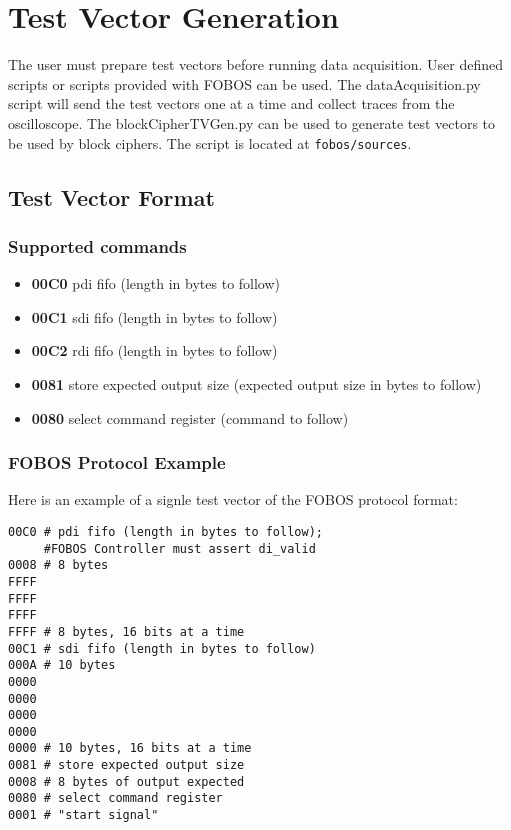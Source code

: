  \chapter{Test Vector Generation} \label{chap:fobos-tv-gen}
 
The user must prepare test vectors before running data acquisition. User defined scripts or scripts provided with FOBOS can be used.
The dataAcquisition.py script will send the test vectors one at a time and collect traces from the oscilloscope.
The blockCipherTVGen.py can be used to generate test vectors to be used by block ciphers. The script is located at \texttt{fobos/sources}.

\section{Test Vector Format}

\subsection{Supported commands}
\begin{itemize}[label={}]
\item \textbf{00C0}  pdi fifo (length in bytes to follow)
\item \textbf{00C1}  sdi fifo (length in bytes to follow)
\item \textbf{00C2}  rdi fifo (length in bytes to follow)
\item \textbf{0081}  store expected output size (expected output size in bytes to follow)
\item \textbf{0080}  select command register (command to follow)
\end{itemize}

\subsection{FOBOS Protocol Example}

Here is an example of a signle test vector of the FOBOS protocol format:

\begin{verbatim}
00C0 # pdi fifo (length in bytes to follow);
     #FOBOS Controller must assert di_valid
0008 # 8 bytes
FFFF
FFFF
FFFF
FFFF # 8 bytes, 16 bits at a time
00C1 # sdi fifo (length in bytes to follow)
000A # 10 bytes
0000
0000
0000
0000
0000 # 10 bytes, 16 bits at a time
0081 # store expected output size
0008 # 8 bytes of output expected
0080 # select command register
0001 # "start signal"
\end{verbatim}



